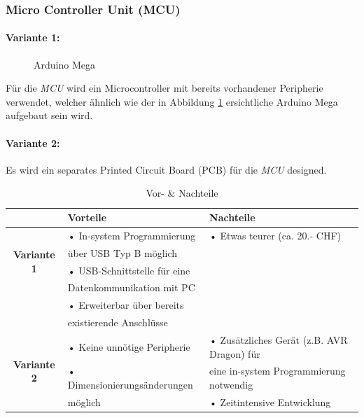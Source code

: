 \subsubsection{Micro Controller Unit (MCU)}
\paragraph{Variante 1:}
\begin{figure}
  \vspace{-10pt}
  \begin{center}
  \end{center}
  \vspace{-10pt}
  \caption{Arduino Mega \cite{Elektronik}}
  \vspace{-10pt}
  \label{fig:arduino_mega}
\end{figure}
Für die \textit{MCU} wird ein Microcontroller mit bereits vorhandener Peripherie verwendet, welcher ähnlich wie der in Abbildung \ref{fig:arduino_mega} ersichtliche Arduino Mega aufgebaut sein wird.

\paragraph{Variante 2:}
Es wird ein separates Printed Circuit Board (PCB) für die \textit{MCU} designed.\\
\vspace*{2cm}
\begin{table}[h]
  \centering
  \label{tab:mcu}
  \small
  \caption{Vor- \& Nachteile}
    \begin{tabular}{c|l|l}
          & \textbf{Vorteile} & \textbf{Nachteile} \\
    \toprule
    \multirow{4}[2]{*}{\textbf{Variante 1}} & • In-system Programmierung & • Etwas teurer (ca. 20.- CHF) \\
          & \hspace{0.3cm} über USB Typ B möglich &  \\
          & • USB-Schnittstelle für eine &  \\
          &   \hspace{0.3cm} Datenkommunikation mit PC &  \\
          & • Erweiterbar über bereits  &  \\
          &   \hspace{0.3cm} existierende Anschlüsse &  \\
    \hline
    \multirow{3}[1]{*}{\textbf{Variante 2}} & • Keine unnötige Peripherie & • Zusätzliches Gerät (z.B. AVR Dragon) für \\
          & • Dimensionierungsänderungen & \hspace{0.3cm} eine in-system Programmierung notwendig \\
          & \hspace{0.3cm} möglich & • Zeitintensive Entwicklung\\
    \end{tabular}%
  \label{tab:mcu}%
\end{table}%

